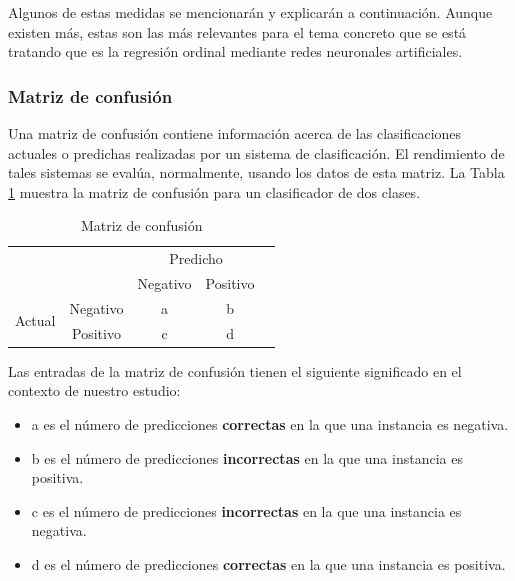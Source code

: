			Algunos de estas medidas se mencionarán y explicarán a continuación. Aunque existen más, estas son las más relevantes para el tema concreto que se está tratando que es la regresión ordinal mediante redes neuronales artificiales.
		
			\subsubsection{Matriz de confusión}
			
			Una matriz de confusión contiene información acerca de las clasificaciones actuales o predichas realizadas por un sistema de clasificación. El rendimiento de tales sistemas se evalúa, normalmente, usando los datos de esta matriz. La Tabla \ref{tabla_matriz_confusion} muestra la matriz de confusión para un clasificador de dos clases.\\
			
			\begin{table}[h]
				\centering
				\begin{tabular}{cc|c|c|c}
					\cline{3-4}
					& & \multicolumn{2}{|c|}{Predicho} \\ \cline{3-4}
					& & Negativo & Positivo \\ \cline{1-4}
					\multicolumn{1}{|c|}{\multirow{2}{*}{Actual}} &
					\multicolumn{1}{|c|}{Negativo} & a & b &     \\ \cline{2-4}
					\multicolumn{1}{|c|}{}                        &
					\multicolumn{1}{|c|}{Positivo} & c & d &     \\ \cline{1-4}
				\end{tabular}
				\caption{Matriz de confusión}
				\label{tabla_matriz_confusion}
			\end{table}
			
			Las entradas de la matriz de confusión tienen el siguiente significado en el contexto de nuestro estudio:

			\begin{itemize}
				\item a es el número de predicciones \textbf{correctas} en la que una instancia es negativa.
				\item b es el número de predicciones \textbf{incorrectas} en la que una instancia es positiva.
				\item c es el número de predicciones \textbf{incorrectas} en la que una instancia es negativa.
				\item d es el número de predicciones \textbf{correctas} en la que una instancia es positiva.
			\end{itemize}


